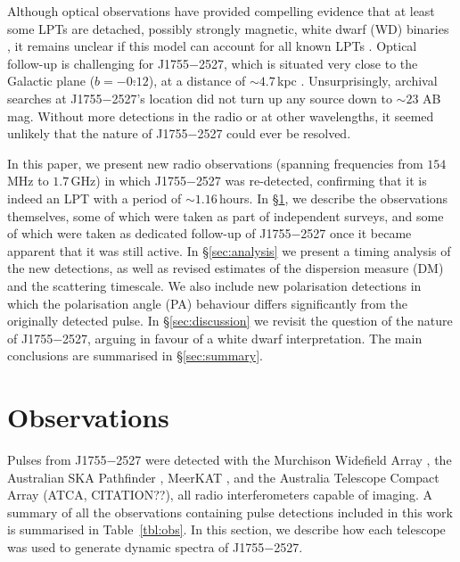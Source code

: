 \documentclass[fleqn,usenatbib]{mnras}
\newcommand{\todo}[1]{{\color{red}#1}}
\newcommand{\src}{J1755$-$2527}
\newcommand{\Tab}{Table}
\begin{document}
Although optical observations have provided compelling evidence that at least some LPTs are detached, possibly strongly magnetic, white dwarf (WD) binaries \citep{deRuiter2025,2024ApJ...976L..21H,2025A&A...695L...8R}, it remains unclear if this model can account for all known LPTs \citep[e.g.][]{2022ApJ...940...72R,Lee2025}.
Optical follow-up is challenging for \src{}, which is situated very close to the Galactic plane ($b = -0\overset{\circ}{.}12$), at a distance of ${\sim}4.7\,$kpc .
Unsurprisingly, archival searches at \src{}'s location did not turn up any source down to ${\sim}23$ AB mag.
Without more detections in the radio or at other wavelengths, it seemed unlikely that the nature of \src{} could ever be resolved.

In this paper, we present new radio observations (spanning frequencies from $154\,$MHz to $1.7\,$GHz) in which \src{} was re-detected, confirming that it is indeed an LPT with a period of ${\sim}1.16\,$hours.
In \S\ref{sec:observations}, we describe the observations themselves, some of which were taken as part of independent surveys, and some of which were taken as dedicated follow-up of \src{} once it became apparent that it was still active.
In \S\ref{sec:analysis} we present a timing analysis of the new detections, as well as revised estimates of the dispersion measure (DM) and the scattering timescale.
We also include new polarisation detections in which the polarisation angle (PA) behaviour differs significantly from the originally detected pulse.
In \S\ref{sec:discussion} we revisit the question of the nature of \src{}, arguing in favour of a white dwarf interpretation.
The main conclusions are summarised in \S\ref{sec:summary}.

\section{Observations} \label{sec:observations}

Pulses from \src{} were detected with the Murchison Widefield Array \citep[MWA;][]{Tingay2013}, the Australian SKA Pathfinder \citep[ASKAP;][]{2021PASA...38....9H}, MeerKAT \citep{2016mks..confE...1J}, and the Australia Telescope Compact Array (ATCA, \todo{CITATION??}), all radio interferometers capable of imaging.
A summary of all the observations containing pulse detections included in this work is summarised in \Tab~\ref{tbl:obs}.
In this section, we describe how each telescope was used to generate dynamic spectra of \src{}.
\end{document}
